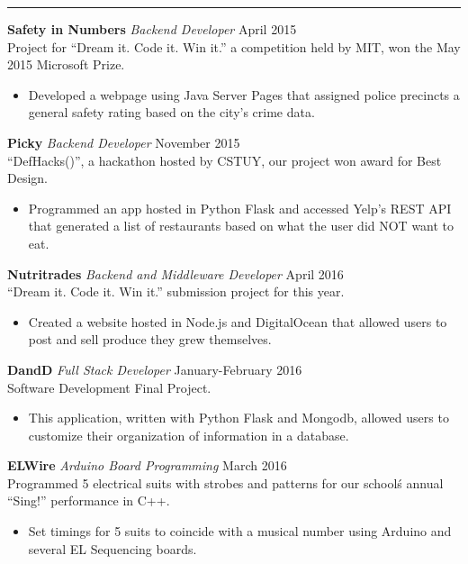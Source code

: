 \documentclass[14, .75in]{article}
\begin{document}
  \vspace{0.1cm} \hrule \vspace{0.2cm}
  \noindent\textbf{Safety in Numbers}\textit{ Backend Developer} \hfill April 2015\\
  Project for ``Dream it. Code it. Win it.'' a competition held by MIT, won the May 2015 Microsoft Prize.
  \begin{itemize}[label={--},noitemsep, topsep=0pt]
    \item Developed a webpage using Java Server Pages that assigned police precincts a general safety rating based on the city's crime data.
  \end{itemize}
  \textbf{Picky}\textit{ Backend Developer} \hfill November 2015\\ ``DefHacks()'', a hackathon hosted by CSTUY, our project won award for Best Design.
  \begin{itemize}[label={--},noitemsep, topsep=0pt]
    \item Programmed an app hosted in Python Flask and accessed Yelp's REST API that generated a list of restaurants based on what the user did NOT want to eat.
  \end{itemize}
  \textbf{Nutritrades}\textit{ Backend and Middleware Developer} \hfill April 2016\\
  ``Dream it. Code it. Win it.'' submission project for this year.
  \begin{itemize}[label={--},noitemsep, topsep=0pt]
    \item Created a website hosted in Node.js and DigitalOcean that allowed users to post and sell produce they grew themselves.
  \end{itemize}
  \textbf{DandD}\textit{ Full Stack Developer} \hfill January-February 2016\\
  Software Development Final Project.
  \begin{itemize}[label={--},noitemsep, topsep=0pt]
    \item This application, written with Python Flask and Mongodb, allowed users to customize their organization of information in a database.
  \end{itemize}
  \textbf{ELWire}\textit{ Arduino Board Programming} \hfill March 2016\\
  Programmed 5 electrical suits with strobes and patterns for our school\'s annual ``Sing!'' performance in C++.
  \begin{itemize}[label={--},noitemsep, topsep=0pt]
    \item Set timings for 5 suits to coincide with a musical number using Arduino and several EL Sequencing boards.
  \end{itemize}
\end{document}
